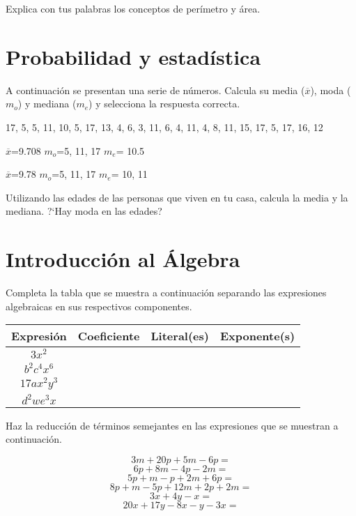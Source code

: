 \documentclass[11pt]{article}
\begin{document}
\newpage
Explica con tus palabras los conceptos de per\'imetro y \'area.

\vspace{3cm}
\section{Probabilidad y estad\'istica}

A continuaci\'on se presentan una serie de n\'umeros. Calcula su media
($\overline{x}$), moda ($m_{o}$) y mediana ($m_{e}$) y selecciona la respuesta
correcta.


17, 5, 5, 11, 10, 5, 17, 13, 4, 6, 3, 11, 6, 4, 11, 4, 8, 11, 15, 17, 5, 17, 16,
12

\hfill {} $\overline{x}$=9.708  $m_{o}$=5, 11, 17  $m_{e}$= 10.5 \quad

\hfill {} $\overline{x}$=9.78   $m_{o}$=5, 11, 17  $m_{e}$= 10, 11

\vspace{4cm}
Utilizando las edades de las personas que viven en tu casa, calcula la media y
la mediana. ?`Hay moda en las edades?

\vspace{3cm}
\section{Introducci\'on al \'Algebra}

Completa la tabla que se muestra a continuaci\'on separando las expresiones
algebraicas en sus respectivos componentes.

\begin{center}
{\large
\begin{tabular}{|c|c|c|c|}
\hline
Expresi\'on & Coeficiente & Literal(es) & Exponente(s)  \\ \hline 
$3x^2$ &&&\\ \hline
$b^2c^4x^6$ &&&\\ \hline
$17ax^2y^3$ &&&\\ \hline
$d^2we^3x$ &&&\\ \hline
\end{tabular}
}
\end{center}

\newpage
\setcounter{equation}{0}
Haz la reducci\'on de t\'erminos semejantes en las expresiones que se muestran a
continuaci\'on.

    
\begin{equation}
3m + 20p + 5m - 6p = 
\end{equation}
\begin{equation}
6p + 8m - 4p - 2m = 
\end{equation}
\begin{equation}
5p + m -p +2m + 6p =
\end{equation}
\begin{equation}
8p + m -5p + 12m + 2p + 2m =
\end{equation}
\begin{equation}
3x + 4y - x = 
\end{equation}
\begin{equation}
20x + 17y - 8x - y -3x =
\end{equation}
\end{document}
